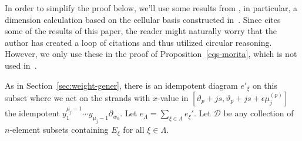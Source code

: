 \documentclass[10pt]{article}
\theoremstyle{definition}
\begin{document}
In order to simplify the proof below, we'll use some results from
\cite{WebRou}, in particular, a dimension calculation based on the
cellular basis constructed in~\cite[Thm.~2.26]{WebRou}. Since
\cite{WebRou} cites some of the results of this paper, the reader
might naturally worry that the author has created a loop of citations
and thus utilized circular reasoning. However, we only use these in the
proof of Proposition~\ref{cqs-morita}, which is not used in~\cite{WebRou}.




As in
Section~\ref{sec:weight-gener}, there is an idempotent diagram
$e'_\xi$ on this
subset where we act on the strands with $x$-value in $[
\vartheta_p+js,\vartheta_p+js+\epsilon\mu^{(p)}_j]$ the idempotent 
$y^{\mu_j-1}_1\cdots y_{\mu_j-1}\partial_{w_0}$. Let
$e_\Lambda=\sum_{\xi\in \Lambda} e_\xi'$. Let $\mathscr{D}$ be any
collection of $n$-element subsets containing $E_\xi$ for all $\xi\in \Lambda$.
\end{document}
